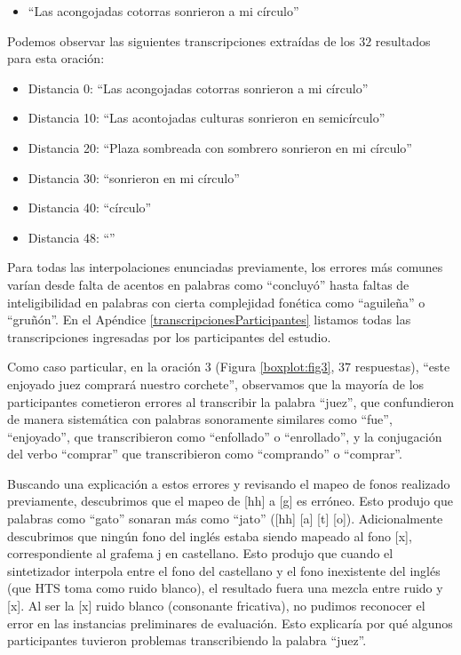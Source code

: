 \begin{itemize}
	\item ``Las acongojadas cotorras sonrieron a mi círculo''
\end{itemize}

Podemos observar las siguientes transcripciones extraídas de los $32$ resultados para esta oración:

\begin{itemize}
	\item Distancia 0: ``Las acongojadas cotorras sonrieron a mi círculo''
	\item Distancia 10: ``Las acontojadas culturas sonrieron en semicírculo''
	\item Distancia 20: ``Plaza sombreada con sombrero sonrieron en mi círculo''
	\item Distancia 30: ``sonrieron en mi círculo''
	\item Distancia 40: ``círculo''
	\item Distancia 48: ``''
\end{itemize}

Para todas las interpolaciones enunciadas previamente, los errores más comunes varían desde falta de acentos en palabras como ``concluyó'' hasta faltas de inteligibilidad en palabras con cierta complejidad fonética como ``aguileña'' o ``gruñón''. En el Apéndice \ref{transcripcionesParticipantes} listamos todas las transcripciones ingresadas por los participantes del estudio.

Como caso particular, en la oración $3$ (Figura \ref{boxplot:fig3}, $37$ respuestas), ``este enjoyado juez comprará nuestro corchete'', observamos que la mayoría de los participantes cometieron errores al transcribir la palabra ``juez'', que confundieron de manera sistemática con palabras sonoramente similares como ``fue'', ``enjoyado'', que transcribieron como ``enfollado'' o ``enrollado'', y la conjugación del verbo ``comprar'' que transcribieron como ``comprando'' o ``comprar''.

Buscando una explicación a estos errores y revisando el mapeo de fonos realizado previamente, descubrimos que el mapeo de [hh] a [g] es erróneo. Esto produjo que palabras como ``gato'' sonaran más como ``jato'' ([hh] [a] [t] [o]). Adicionalmente descubrimos que ningún fono del inglés estaba siendo mapeado al fono [x], correspondiente al grafema j en castellano. Esto produjo que cuando el sintetizador interpola entre el fono del castellano y el fono inexistente del inglés (que HTS toma como ruido blanco), el resultado fuera una mezcla entre ruido y [x]. Al ser la [x] ruido blanco (consonante fricativa), no pudimos reconocer el error en las instancias preliminares de evaluación. Esto explicaría por qué algunos participantes tuvieron problemas transcribiendo la palabra ``juez''.

